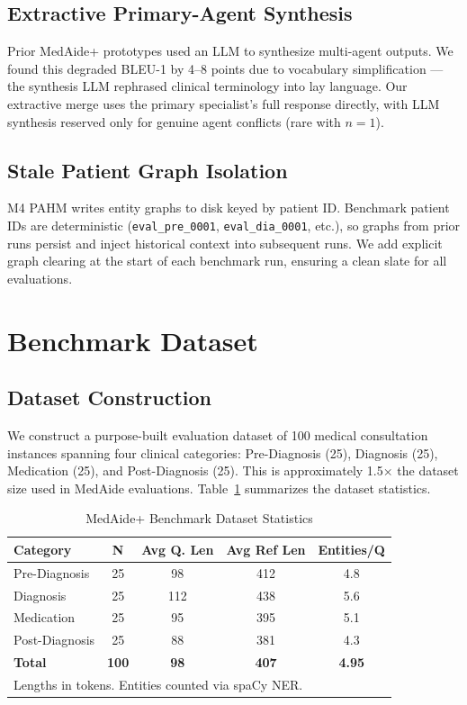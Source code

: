 \documentclass[conference]{IEEEtran}
\begin{document}
\subsection{Extractive Primary-Agent Synthesis}

Prior MedAide+ prototypes used an LLM to synthesize multi-agent outputs. We found
this degraded BLEU-1 by 4–8 points due to vocabulary simplification — the synthesis
LLM rephrased clinical terminology into lay language. Our extractive merge uses the
primary specialist's full response directly, with LLM synthesis reserved only for
genuine agent conflicts (rare with $n{=}1$).

\subsection{Stale Patient Graph Isolation}

M4 PAHM writes entity graphs to disk keyed by patient ID. Benchmark patient IDs are
deterministic (\texttt{eval\_pre\_0001}, \texttt{eval\_dia\_0001}, etc.), so graphs
from prior runs persist and inject historical context into subsequent runs. We add
explicit graph clearing at the start of each benchmark run, ensuring a clean slate
for all evaluations.

\section{Benchmark Dataset}
\label{sec:dataset}

\subsection{Dataset Construction}

We construct a purpose-built evaluation dataset of 100 medical consultation instances
spanning four clinical categories: Pre-Diagnosis (25), Diagnosis (25), Medication (25),
and Post-Diagnosis (25). This is approximately 1.5× the dataset size used in MedAide
evaluations. Table~\ref{tab:dataset} summarizes the dataset statistics.

\begin{table}[t]
\centering
\caption{MedAide+ Benchmark Dataset Statistics}
\label{tab:dataset}
\setlength{\tabcolsep}{4pt}
\begin{tabular}{lcccc}
\toprule
\textbf{Category} & \textbf{N} & \textbf{Avg Q. Len} & \textbf{Avg Ref Len} & \textbf{Entities/Q} \\
\midrule
Pre-Diagnosis  & 25 & 98 & 412 & 4.8 \\
Diagnosis      & 25 & 112 & 438 & 5.6 \\
Medication     & 25 & 95  & 395 & 5.1 \\
Post-Diagnosis & 25 & 88  & 381 & 4.3 \\
\midrule
\textbf{Total} & \textbf{100} & \textbf{98} & \textbf{407} & \textbf{4.95} \\
\bottomrule
\multicolumn{5}{l}{\scriptsize Lengths in tokens. Entities counted via spaCy NER.}\\
\end{tabular}
\end{table}
\end{document}
